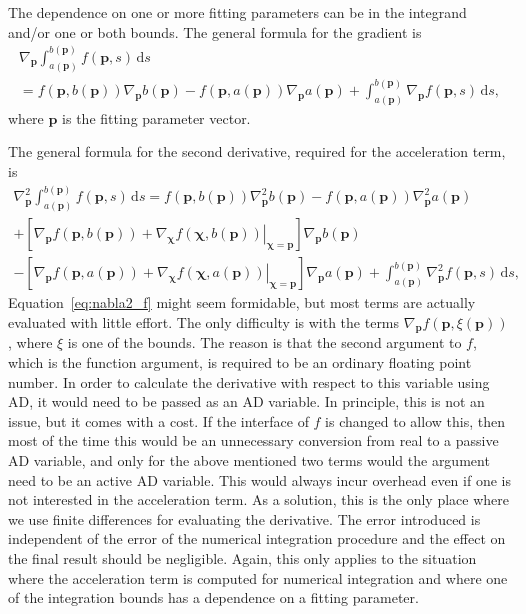 \documentclass{article}
\newcommand{\D}{\,\textrm{d}}
\begin{document}
The dependence on one or more fitting parameters can be in the integrand and/or one or both bounds. The general formula for the gradient is
\begin{multline}
  \label{eq:grad_f}
  \nabla_{\bm p} \int_{a(\bm p)}^{b(\bm p)} f(\bm p, s) \D s \\
  = f(\bm p, b(\bm p)) \nabla_{\bm p} b(\bm p) - f(\bm p, a(\bm p))
  \nabla_{\bm p} a(\bm p) + \int_{a(\bm p)}^{b(\bm p)} \nabla_{\bm p}
  f(\bm p, s) \D s,
\end{multline}
where $\bm p$ is the fitting parameter vector.

The general formula for the second derivative, required for the acceleration term, is
\begin{multline}
  \label{eq:nabla2_f}
  \nabla_{\bm p}^2 \int_{a(\bm p)}^{b(\bm p)} f(\bm p,s) \D s = f(\bm
  p,b(\bm p)) \nabla_{\bm p}^2 b(\bm p) - f(\bm p,a(\bm p))
  \nabla_{\bm p}^2 a(\bm p) \\
  + \left[ \nabla_{\bm p} f(\bm p,b(\bm p)) + \left. \nabla_{\bm\chi}
      f(\bm\chi,b(\bm p)) \right|_{\bm\chi=\bm p} \right] \nabla_{\bm
    p} b(\bm p) \\
  - \left[ \nabla_{\bm p} f(\bm p,a(\bm p)) + \left. \nabla_{\bm\chi}
      f(\bm\chi,a(\bm p)) \right|_{\bm\chi=\bm p} \right] \nabla_{\bm
    p} a(\bm p) + \int_{a(\bm p)}^{b(\bm p)} \nabla_{\bm p}^2 f(\bm p,s)
  \D s,
\end{multline}
Equation~\eqref{eq:nabla2_f} might seem formidable, but most terms are actually evaluated with little effort. The only difficulty is with the terms $\nabla_{\bm p} f(\bm p,\xi(\bm p))$, where $\xi$ is one of the bounds. The reason is that the second argument to $f$, which is the function argument, is required to be an ordinary floating point number. In order to calculate the derivative with respect to this variable using AD, it would need to be passed as an AD variable. In principle, this is not an issue, but it comes with a cost. If the interface of $f$ is changed to allow this, then most of the time this would be an unnecessary conversion from real to a passive AD variable, and only for the above mentioned two terms would the argument need to be an active AD variable. This would always incur overhead even if one is not interested in the acceleration term. As a solution, this is the only place where we use finite differences for evaluating the derivative. The error introduced is independent of the error of the numerical integration procedure and the effect on the final result should be negligible. Again, this only applies to the situation where the acceleration term is computed for numerical integration and where one of the integration bounds has a dependence on a fitting parameter.
\end{document}

